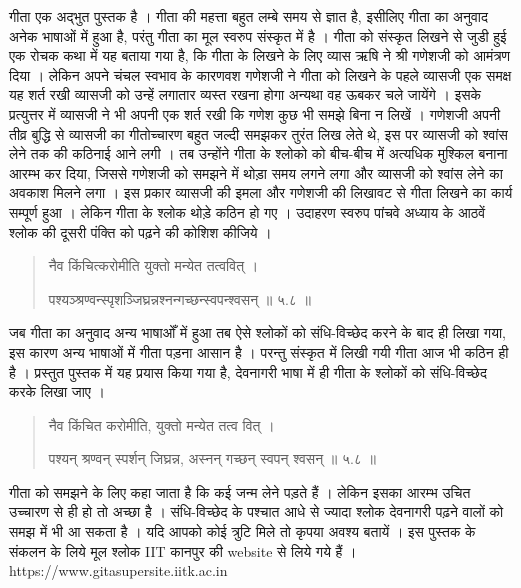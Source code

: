 गीता एक अद्भुत पुस्तक है ।  गीता की महत्ता बहुत लम्बे समय से ज्ञात है, इसीलिए गीता का अनुवाद अनेक भाषाओं में हुआ है, परंतु गीता का मूल स्वरुप संस्कृत में है ।  गीता को संस्कृत लिखने से जुडी हुई एक रोचक कथा में यह बताया गया है, कि गीता के लिखने के लिए व्यास ऋषि ने श्री गणेशजी को आमंत्रण दिया ।  लेकिन अपने चंचल स्वभाव के कारणवश गणेशजी ने गीता को लिखने के पहले व्यासजी एक समक्ष यह शर्त रखी व्यासजी को उन्हें लगातार व्यस्त रखना होगा अन्यथा वह ऊबकर चले जायेंगे ।  इसके प्रत्युत्तर में व्यासजी ने भी अपनी एक शर्त रखी कि गणेश कुछ भी समझे बिना न लिखें ।  गणेशजी अपनी तीव्र बुद्धि से व्यासजी का गीतोच्चारण बहुत जल्दी समझकर तुरंत लिख लेते थे, इस पर व्यासजी को श्वांस लेने तक की कठिनाई आने लगी ।  तब  उन्होंने गीता के श्लोको को बीच-बीच में अत्यधिक मुश्किल बनाना आरम्भ कर दिया, जिससे गणेशजी को समझने में थोड़ा समय लगने लगा और व्यासजी को श्वांस लेने का अवकाश मिलने लगा ।  इस प्रकार व्यासजी की इमला और गणेशजी की लिखावट से गीता लिखने का कार्य सम्पूर्ण हुआ ।  लेकिन गीता के श्लोक थोड़े कठिन हो गए ।  उदाहरण स्वरुप पांचवे अध्याय के आठवें श्लोक की दूसरी पंक्ति को पढ़ने की कोशिश कीजिये । 

\begin{quotation}\sanskrit
नैव किंचित्करोमीति युक्तो मन्येत तत्ववित्‌  । 

पश्यञ्श्रण्वन्स्पृशञ्जिघ्रन्नश्नन्गच्छन्स्वपन्श्वसन्‌  ॥ ५.८ ॥  
\end{quotation}
जब गीता का अनुवाद अन्य भाषाओँ में हुआ तब ऐसे श्लोकों को संधि-विच्छेद करने के बाद ही लिखा गया, इस कारण अन्य भाषाओं में गीता पड़ना आसान है ।  परन्तु संस्कृत में लिखी गयी गीता आज भी कठिन ही है ।  प्रस्तुत पुस्तक में यह प्रयास किया गया है, देवनागरी भाषा में ही गीता के श्लोकों को संधि-विच्छेद करके लिखा जाए । 

\begin{quotation}\sanskrit
नैव किंचित करोमीति, युक्तो मन्येत तत्व वित्‌  । 

पश्यन् श्रण्वन् स्पर्शन् जिघ्रन्न, अस्नन् गच्छन् स्वपन् श्वसन्‌  ॥ ५.८ ॥ 
\end{quotation}
गीता को समझने के लिए कहा जाता है कि कई जन्म लेने पड़ते हैं ।  लेकिन इसका आरम्भ उचित उच्चारण से ही हो तो अच्छा है ।  संधि-विच्छेद के पश्चात आधे से ज्यादा श्लोक देवनागरी पढ़ने वालों को समझ में भी आ सकता है ।  यदि आपको कोई त्रुटि मिले तो कृपया अवश्य बतायें । 
इस पुस्तक के संकलन के लिये मूल श्लोक \textrm{IIT} कानपुर की \textrm{website} से लिये गये हैं ।  \textrm{https://www.gitasupersite.iitk.ac.in}


